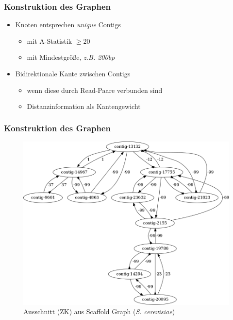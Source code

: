 \documentclass[xcolor=pst]{beamer}
\begin{document}
\begin{frame}
  \frametitle{Konstruktion des Graphen}
  \begin{itemize}
    \item Knoten entsprechen \textit{unique} Contigs
    \begin{itemize}
      \item mit A-Statistik $\geq 20$
      \item mit Mindestgröße, \textit{z.B. 200bp}
    \end{itemize}
    \item Bidirektionale Kante zwischen Contigs
    \begin{itemize}
      \item wenn diese durch Read-Paare verbunden sind
      \item Distanzinformation als Kantengewicht
    \end{itemize}
  \end{itemize}
\end{frame}

\begin{frame}
  \frametitle{Konstruktion des Graphen}
  \begin{center}
    \begin{figure}
      \includegraphics[width=\textwidth,height=0.7\textheight,keepaspectratio]{figures/s_cerevisiae_parsed_graph_example_small.png}
      \caption{Ausschnitt (ZK) aus Scaffold Graph (\textit{S. cerevisiae})}
    \end{figure}
  \end{center}
\end{frame}
\end{document}
